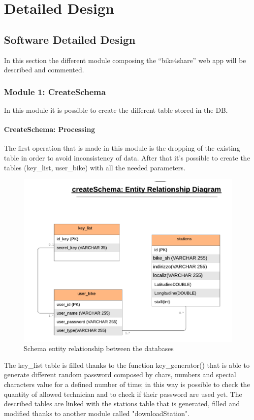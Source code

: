 \documentclass{article}
\begin{document}
\section{Detailed Design}
\subsection{Software Detailed Design}
In this section the different module composing the “bike4share” web app will be described and commented.

\subsubsection{Module 1: CreateSchema}
In this module it is possible to create the different table stored in the DB.
\paragraph{CreateSchema: Processing}
The first operation that is made in this module is the dropping of the existing table in order to avoid inconsistency of data. After that it’s possible to create the tables (key\_list, user\_bike) with all the needed parameters.
\begin{figure}[H]
    \centering
    \includegraphics[width=0.55\linewidth]{image/schema_entity_relationship.png}
    \caption{Schema entity relationship between the databases}
    \label{fig:relationdb}
\end{figure}
The key\_list table is filled thanks to the function key\_generator() that is able to generate different random password composed by chars, numbers and special characters value for a defined number of time; in this way is possible to check the quantity of allowed technician and to check if their password are used yet.
The described tables are linked with the stations table that is generated, filled and modified thanks to another module called "downloadStation". 
\end{document}

